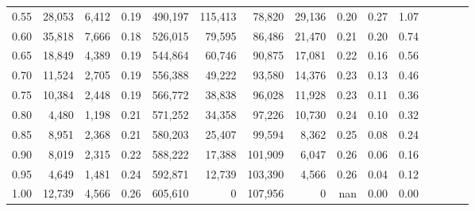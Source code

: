 \begin{tabular}{rrrcrrrrrrrrrrr}
0.55 &   28,053 &   6,412 &                                       0.19 &  490,197 &  115,413 &   78,820 &   29,136 &  0.20 &  0.27 &                         1.07 \\
0.60 &   35,818 &   7,666 &                                       0.18 &  526,015 &   79,595 &   86,486 &   21,470 &  0.21 &  0.20 &                         0.74 \\
0.65 &   18,849 &   4,389 &                                       0.19 &  544,864 &   60,746 &   90,875 &   17,081 &  0.22 &  0.16 &                         0.56 \\
0.70 &   11,524 &   2,705 &                                       0.19 &  556,388 &   49,222 &   93,580 &   14,376 &  0.23 &  0.13 &                         0.46 \\
0.75 &   10,384 &   2,448 &                                       0.19 &  566,772 &   38,838 &   96,028 &   11,928 &  0.23 &  0.11 &                         0.36 \\
0.80 &    4,480 &   1,198 &                                       0.21 &  571,252 &   34,358 &   97,226 &   10,730 &  0.24 &  0.10 &                         0.32 \\
0.85 &    8,951 &   2,368 &                                       0.21 &  580,203 &   25,407 &   99,594 &    8,362 &  0.25 &  0.08 &                         0.24 \\
0.90 &    8,019 &   2,315 &                                       0.22 &  588,222 &   17,388 &  101,909 &    6,047 &  0.26 &  0.06 &                         0.16 \\
0.95 &    4,649 &   1,481 &                                       0.24 &  592,871 &   12,739 &  103,390 &    4,566 &  0.26 &  0.04 &                         0.12 \\
1.00 &   12,739 &   4,566 &                                       0.26 &  605,610 &        0 &  107,956 &        0 &   nan &  0.00 &                         0.00 \\
\bottomrule
\end{tabular}
